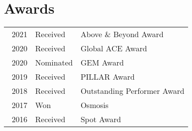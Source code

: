 \documentclass[a4paper]{deedy-resume-openfont}
\begin{document}
\section{Awards} 
\begin{tabular}{rll}\
2021	 & Received & Above \& Beyond Award \\
2020	 & Received & Global ACE Award \\
2020	 & Nominated& GEM Award\\
2019     & Received & PILLAR Award \\
2018     & Received & Outstanding Performer Award  \\
2017     & Won      & Osmosis \\
2016     & Received & Spot Award
\end{tabular}
\sectionsep
\end{document}
